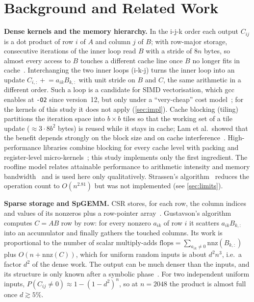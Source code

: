 \documentclass[conference,a4paper]{IEEEtran}
\begin{document}
\section{Background and Related Work}
\label{sec:background}
\textbf{Dense kernels and the memory hierarchy.} In the i-j-k order each output $C_{ij}$ is a dot product of
row $i$ of $A$ and column $j$ of $B$; with row-major storage, consecutive iterations of the inner loop read
$B$ with a stride of $8n$ bytes, so almost every access to $B$ touches a different cache line once $B$ no
longer fits in cache~\cite{hennessy2017}. Interchanging the two inner loops (i-k-j) turns the inner loop into
an update $C_{i,:} \mathrel{+}= a_{ik}B_{k,:}$ with unit stride on $B$ and $C$, the same arithmetic in a
different order. Such a loop is a candidate for SIMD vectorisation, which gcc enables at \texttt{-O2} since
version~12, but only under a ``very-cheap'' cost model~\cite{gcc12}; for the kernels of this study it does
not apply (\cref{sec:impl}). Cache blocking (tiling) partitions the iteration space into $b\times b$ tiles so
that the working set of a tile update ($\approx 3\cdot 8b^2$ bytes) is reused while it stays in cache; Lam
et al.\ showed that the benefit depends strongly on the block size and on cache interference~\cite{lam1991}.
High-performance libraries combine blocking for every cache level with packing and register-level
micro-kernels~\cite{goto2008}; this study implements only the first ingredient. The roofline model relates
attainable performance to arithmetic intensity and memory bandwidth~\cite{williams2009} and is used here
only qualitatively. Strassen's algorithm~\cite{strassen1969} reduces the operation count to
$O(n^{2.81})$ but was not implemented (see \cref{sec:limits}).

\textbf{Sparse storage and SpGEMM.} CSR stores, for each row, the column indices and values of its nonzeros
plus a row-pointer array~\cite{saad2003}. Gustavson's algorithm~\cite{gustavson1978} computes $C=AB$ row by
row: for every nonzero $a_{ik}$ of row $i$ it scatters $a_{ik}B_{k,:}$ into an accumulator and finally
gathers the touched columns. Its work is proportional to the number of scalar multiply-adds
$\mathrm{flops}=\sum_{a_{ik}\neq 0}\mathrm{nnz}(B_{k,:})$ plus $O(n+\mathrm{nnz}(C))$, which for uniform
random inputs is about $d^2n^3$, i.e.\ a factor $d^2$ of the dense work. The output can be much denser than
the inputs, and its structure is only known after a symbolic phase~\cite{buluc2012}. For two independent
uniform inputs, $P(C_{ij}\neq 0)\approx 1-(1-d^2)^n$, so at $n=2048$ the product is almost full once
$d\gtrsim 5\%$.
\end{document}
